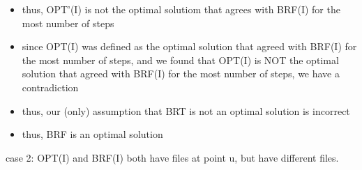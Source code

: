 \documentclass[a4paper]{article}
\begin{document}
\begin{itemize}
\begin{itemize}
        \item thus, OPT'(I) is not the optimal solutiom that agrees with BRF(I) for the most number of steps
        \item since OPT(I) was defined as the optimal solution that agreed with BRF(I) for the most number of steps, and we found that OPT(I) is NOT the optimal solution that agreed with BRF(I) for the most number of steps, we have a contradiction
        \item thus, our (only) assumption that BRT is not an optimal solution is incorrect
        \item thus, BRF is an optimal solution
    \end{itemize}
\end{itemize}

case 2: OPT(I) and BRF(I) both have files at point u, but have different files.
\end{document}

